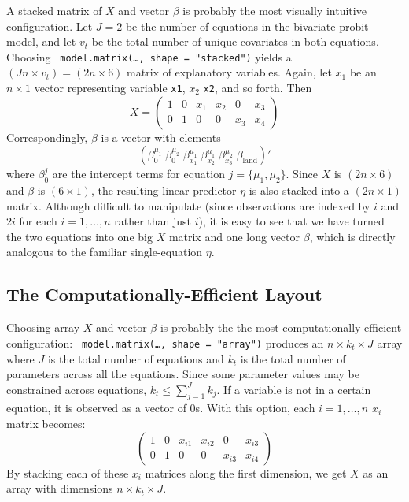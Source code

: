 A stacked matrix of $X$ and vector $\beta$ is probably the most
visually intuitive configuration.  Let $J = 2$ be the number of
equations in the bivariate probit model, and let $v_t$ be the total
number of unique covariates in both equations.  Choosing {\tt
model.matrix(\dots, shape = "stacked")} yields a $(Jn \times v_t) =
(2n \times 6)$ matrix of explanatory variables.  Again, let $x_1$ be
an $n \times 1$ vector representing variable {\tt x1}, $x_2$ {\tt x2},
and so forth.  Then
\begin{equation*}
X = \left (\begin{array}{cccccc}
1 & 0 & x_1 & x_2 & 0   & x_3  \\ 
0 & 1 & 0   & 0   & x_3 & x_4
\end{array} \right) 
\end{equation*}
Correspondingly, $\beta$ is a vector with elements
\begin{equation*}
(\beta_0^{\mu_1} \; \beta_0^{\mu_2} \; \beta_{x_1}^{\mu_1} \;
\beta_{x_2}^{\mu_1} \; \beta_{x_3}^{\mu_2} \; \beta_{\textrm{land}})\prime
\end{equation*}
where $\beta_0^j$ are the intercept terms for equation $j = \{\mu_1,
\mu_2\}$.  Since $X$ is $(2n \times 6)$ and $\beta$ is $(6 \times 1)$, the
resulting linear predictor $\eta$ is also stacked into a $(2n \times
1)$ matrix.  Although difficult to manipulate (since observations are
indexed by $i$ and $2i$ for each $i = 1, \dots, n$ rather than just
$i$), it is easy to see that we have turned the two equations into one
big $X$ matrix and one long vector $\beta$, which is directly
analogous to the familiar single-equation $\eta$.

\subsection{The Computationally-Efficient Layout}

Choosing array $X$ and vector $\beta$ is probably the the most
computationally-efficient configuration: {\tt
model.matrix(\dots, shape = "array")} produces an $n \times k_t
\times J$ array where $J$ is the total number of equations and $k_t$
is the total number of parameters across all the equations.  Since some
parameter values may be constrained across equations, $k_t \leq
\sum_{j=1}^J k_j$.  If a variable is not in a certain equation, it is
observed as a vector of 0s.  With this option, each $i = 1, \dots, n$
$x_i$ matrix becomes:
\begin{equation*}
\left( \begin{array}{ccccccc}
1 & 0 & x_{i1} & x_{i2} & 0      & x_{i3} \\
0 & 1 & 0      & 0      & x_{i3} & x_{i4}
\end{array} \right) 
\end{equation*}
By stacking each of these $x_i$ matrices along the first dimension,
we get $X$ as an array with dimensions $n \times k_t \times J$.  

